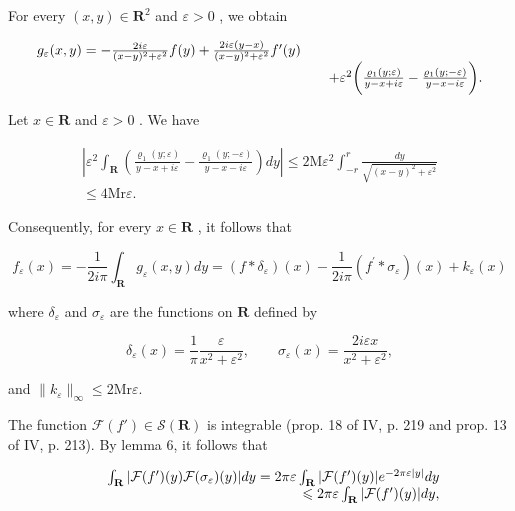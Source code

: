 For every \((x,y)\in \mathbf{R}^2\) and \(\varepsilon >0\) , we obtain

\[
\begin{array}{r l} g _ {\varepsilon} (x, y) = - \frac {2 i \varepsilon}{(x - y) ^ {2} + \varepsilon^ {2}} f (y) + \frac {2 i \varepsilon (y - x)}{(x - y) ^ {2} + \varepsilon^ {2}} f ^ {\prime} (y) \\ & \quad + \varepsilon^ {2} \bigg (\frac {\varrho_ {1} (y ; \varepsilon)}{y - x + i \varepsilon} - \frac {\varrho_ {1} (y ; - \varepsilon)}{y - x - i \varepsilon} \bigg). \end{array}
\]

Let \(x \in \mathbf{R}\) and \(\varepsilon > 0\) . We have

\[
\begin{array}{c} \left| \varepsilon^ {2} \int_ {\mathbf {R}} \left(\frac {\varrho_ {1} (y ; \varepsilon)}{y - x + i \varepsilon} - \frac {\varrho_ {1} (y ; - \varepsilon)}{y - x - i \varepsilon}\right) d y \right| \leqslant 2 \mathrm{M} \varepsilon^ {2} \int_ {- r} ^ {r} \frac {d y}{\sqrt {(x - y) ^ {2} + \varepsilon^ {2}}} \\ \leqslant 4 \mathrm{Mr} \varepsilon . \end{array}
\]

Consequently, for every \(x \in \mathbf{R}\) , it follows that

\[
f _ {\varepsilon} (x) = - \frac {1}{2 i \pi} \int_ {\mathbf {R}} g _ {\varepsilon} (x, y) d y = (f * \delta_ {\varepsilon}) (x) - \frac {1}{2 i \pi} (f ^ {\prime} * \sigma_ {\varepsilon}) (x) + k _ {\varepsilon} (x)
\]

where \(\delta_{\varepsilon}\) and \(\sigma_{\varepsilon}\) are the functions on \(\mathbf{R}\) defined by

\[
\delta_ {\varepsilon} (x) = \frac {1}{\pi} \frac {\varepsilon}{x ^ {2} + \varepsilon^ {2}}, \qquad \sigma_ {\varepsilon} (x) = \frac {2 i \varepsilon x}{x ^ {2} + \varepsilon^ {2}},
\]

and \(\| k_{\varepsilon}\|_{\infty}\leqslant 2\mathrm{Mr}\varepsilon .\)

The function \(\mathcal{F}(f') \in \mathcal{S}(\mathbf{R})\) is integrable (prop. 18 of IV, p. 219 and prop. 13 of IV, p. 213). By lemma 6, it follows that

\[
\begin{array}{r l r} & & {\int_ {\mathbf {R}} | \mathcal {F} (f ^ {\prime}) (y) \mathcal {F} (\sigma_ {\varepsilon}) (y) | d y = 2 \pi \varepsilon \int_ {\mathbf {R}} | \mathcal {F} (f ^ {\prime}) (y) | e ^ {- 2 \pi \varepsilon | y |} d y} \\ & & {\leqslant 2 \pi \varepsilon \int_ {\mathbf {R}} | \mathcal {F} (f ^ {\prime}) (y) | d y,} \end{array}
\]

